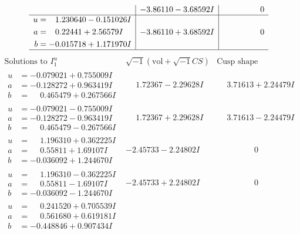 \documentclass[1p]{elsarticle_modified}
\theoremstyle{definition}
\newcommand{\I}{\sqrt{-1}}
\begin{document}
$$\begin{array}{c|c|c}
 & -3.86110 - 3.68592 I & \phantom{-0.000000 } 0 \\ \hline\begin{aligned}
u &= \phantom{-}1.230640 - 0.151026 I \\
a &= \phantom{-}0.22441 + 2.56579 I \\
b &= -0.015718 + 1.171970 I\end{aligned}
 & -3.86110 + 3.68592 I & \phantom{-0.000000 } 0\\
 \hline 
 \end{array}$$\newpage$$\begin{array}{c|c|c}  
\text{Solutions to }I^u_{1}& \I (\text{vol} + \sqrt{-1}CS) & \text{Cusp shape}\\
 \hline 
\begin{aligned}
u &= -0.079021 + 0.755009 I \\
a &= -0.128272 + 0.963419 I \\
b &= \phantom{-}0.465479 + 0.267566 I\end{aligned}
 & \phantom{-}1.72367 - 2.29628 I & \phantom{-}3.71613 + 2.24479 I \\ \hline\begin{aligned}
u &= -0.079021 - 0.755009 I \\
a &= -0.128272 - 0.963419 I \\
b &= \phantom{-}0.465479 - 0.267566 I\end{aligned}
 & \phantom{-}1.72367 + 2.29628 I & \phantom{-}3.71613 - 2.24479 I \\ \hline\begin{aligned}
u &= \phantom{-}1.196310 + 0.362225 I \\
a &= \phantom{-}0.55811 + 1.69107 I \\
b &= -0.036092 + 1.244670 I\end{aligned}
 & -2.45733 - 2.24802 I & \phantom{-0.000000 } 0 \\ \hline\begin{aligned}
u &= \phantom{-}1.196310 - 0.362225 I \\
a &= \phantom{-}0.55811 - 1.69107 I \\
b &= -0.036092 - 1.244670 I\end{aligned}
 & -2.45733 + 2.24802 I & \phantom{-0.000000 } 0 \\ \hline\begin{aligned}
u &= \phantom{-}0.241520 + 0.705539 I \\
a &= \phantom{-}0.561680 + 0.619181 I \\
b &= -0.448846 + 0.907434 I\end{aligned}

\end{array}$$
\end{document}
